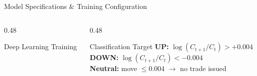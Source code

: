 \documentclass[aspectratio=43,11pt]{beamer}
\begin{document}
\begin{frame}[shrink=5]{Model Specifications \& Training Configuration}
\begin{columns}[T]
\begin{column}{0.48\textwidth}
\begin{block}{Deep Learning Training}
            \end{block}
        \end{column}
        \begin{column}{0.48\textwidth}
            \begin{exampleblock}{Classification Target}
                \footnotesize
                \textbf{UP:} $\log(C_{t+1}/C_t) > +0.004$ \\
                \textbf{DOWN:} $\log(C_{t+1}/C_t) < -0.004$ \\
                \textbf{Neutral:} move $\leq 0.004$ $\to$ no trade issued
            \end{exampleblock}
        \end{column}
    \end{columns}
\end{frame}
\end{document}
